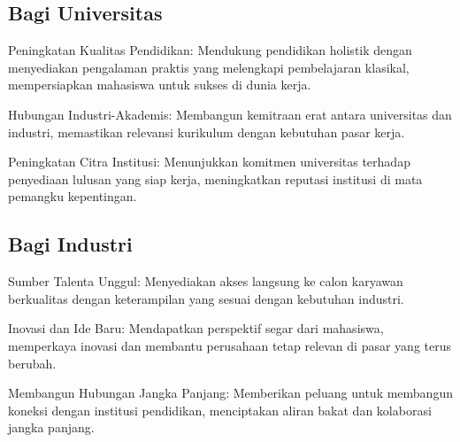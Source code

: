 \subsection{Bagi Universitas}

\begin{packed_enum}
	\item Peningkatan Kualitas Pendidikan: Mendukung pendidikan holistik dengan menyediakan pengalaman praktis yang melengkapi pembelajaran klasikal, mempersiapkan mahasiswa untuk sukses di dunia kerja.
	\item Hubungan Industri-Akademis: Membangun kemitraan erat antara universitas dan industri, memastikan relevansi kurikulum dengan kebutuhan pasar kerja.
	\item Peningkatan Citra Institusi: Menunjukkan komitmen universitas terhadap penyediaan lulusan yang siap kerja, meningkatkan reputasi institusi di mata pemangku kepentingan.
\end{packed_enum}

\subsection{Bagi Industri}

\begin{packed_enum}
	\item Sumber Talenta Unggul: Menyediakan akses langsung ke calon karyawan berkualitas dengan keterampilan yang sesuai dengan kebutuhan industri.
	\item Inovasi dan Ide Baru: Mendapatkan perspektif segar dari mahasiswa, memperkaya inovasi dan membantu perusahaan tetap relevan di pasar yang terus berubah.
	\item Membangun Hubungan Jangka Panjang: Memberikan peluang untuk membangun koneksi dengan institusi pendidikan, menciptakan aliran bakat dan kolaborasi jangka panjang.
\end{packed_enum}